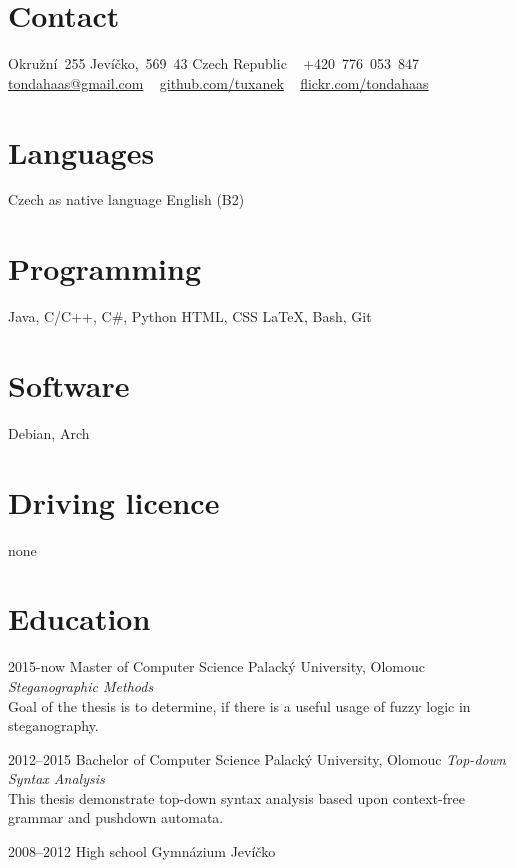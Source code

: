 \documentclass[]{friggeri-cv} %
\begin{document}


\begin{aside} %
\section{Contact}
Okružní~255
Jevíčko,~569~43
Czech Republic
~
+420~776~053~847
\href{mailto:tondahaas@gmail.com}{tondahaas@gmail.com}
~
\href{https://github.com/tuxanek}{github.com/tuxanek}
~
\href{https://flickr.com/tondahaas}{flickr.com/tondahaas}
\section{Languages}
Czech as native language
English (B2)
\section{Programming}
Java, C/C++, C\#, Python
HTML, CSS
LaTeX, Bash, Git
\section{Software}
Debian, Arch
\section{Driving licence}
none
\end{aside}


\section{Education}

\begin{entrylist}

\entry
{2015-now}
{Master {\normalfont of Computer Science}}
{Palacký University, Olomouc}
{\emph{Steganographic Methods} \\ Goal of the thesis is to determine, if there is a useful usage of fuzzy logic in steganography.}

\entry
{2012--2015}
{Bachelor {\normalfont of Computer Science}}
{Palacký University, Olomouc}
{\emph{Top-down Syntax Analysis} \\ This thesis demonstrate top-down syntax analysis based upon context-free grammar and pushdown automata.}

\entry
{2008--2012}
{{\normalfont High school}}
{Gymnázium Jevíčko}

\end{entrylist}
\end{document}
